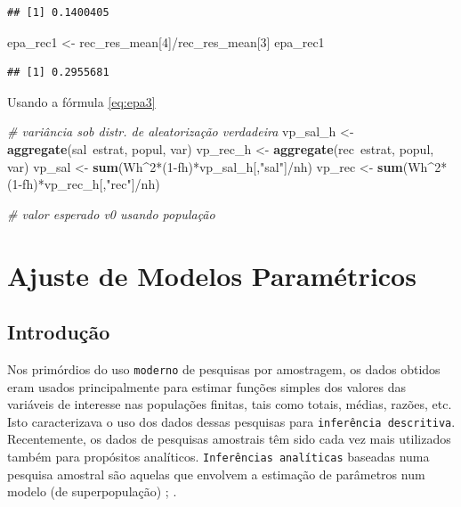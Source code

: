 \documentclass[]{book}
\newenvironment{Shaded}{\begin{snugshade}}{\end{snugshade}}
\newcommand{\KeywordTok}[1]{\textcolor[rgb]{0.13,0.29,0.53}{\textbf{{#1}}}}
\newcommand{\DecValTok}[1]{\textcolor[rgb]{0.00,0.00,0.81}{{#1}}}
\newcommand{\StringTok}[1]{\textcolor[rgb]{0.31,0.60,0.02}{{#1}}}
\newcommand{\CommentTok}[1]{\textcolor[rgb]{0.56,0.35,0.01}{\textit{{#1}}}}
\newcommand{\NormalTok}[1]{{#1}}
\numberwithin{example}{chapter}
\numberwithin{remark}{chapter}
\numberwithin{definition}{chapter}
\begin{document}
\begin{verbatim}
## [1] 0.1400405
\end{verbatim}

\begin{Shaded}
\begin{Highlighting}[]
\NormalTok{epa_rec1 <-}\StringTok{ }\NormalTok{rec_res_mean[}\DecValTok{4}\NormalTok{]/rec_res_mean[}\DecValTok{3}\NormalTok{]}
\NormalTok{epa_rec1}
\end{Highlighting}
\end{Shaded}

\begin{verbatim}
## [1] 0.2955681
\end{verbatim}

Usando a fórmula \eqref{eq:epa3}

\begin{Shaded}
\begin{Highlighting}[]
\CommentTok{# variância sob distr. de aleatorização verdadeira}
\NormalTok{vp_sal_h <-}\StringTok{ }\KeywordTok{aggregate}\NormalTok{(sal~estrat, popul, var)}
\NormalTok{vp_rec_h <-}\StringTok{ }\KeywordTok{aggregate}\NormalTok{(rec~estrat, popul, var)}
\NormalTok{vp_sal <-}\StringTok{ }\KeywordTok{sum}\NormalTok{(Wh^}\DecValTok{2}\NormalTok{*(}\DecValTok{1}\NormalTok{-fh)*vp_sal_h[,}\StringTok{"sal"}\NormalTok{]/nh)}
\NormalTok{vp_rec <-}\StringTok{ }\KeywordTok{sum}\NormalTok{(Wh^}\DecValTok{2}\NormalTok{*(}\DecValTok{1}\NormalTok{-fh)*vp_rec_h[,}\StringTok{"rec"}\NormalTok{]/nh)}
\end{Highlighting}
\end{Shaded}

\begin{Shaded}
\begin{Highlighting}[]
\CommentTok{# valor esperado v0 usando população}
\end{Highlighting}
\end{Shaded}

\chapter{Ajuste de Modelos Paramétricos}\label{ajmodpar}

\section{Introdução}\label{modpar1}

Nos primórdios do uso \texttt{moderno} de pesquisas por amostragem, os
dados obtidos eram usados principalmente para estimar funções simples
dos valores das variáveis de interesse nas populações finitas, tais como
totais, médias, razões, etc. Isto caracterizava o uso dos dados dessas
pesquisas para \texttt{inferência\ descritiva}. Recentemente, os dados
de pesquisas amostrais têm sido cada vez mais utilizados também para
propósitos analíticos. \texttt{Inferências\ analíticas} baseadas numa
pesquisa amostral são aquelas que envolvem a estimação de parâmetros num
modelo (de superpopulação) \citep{kalton83b}; \citep{binder87}.
\end{document}

